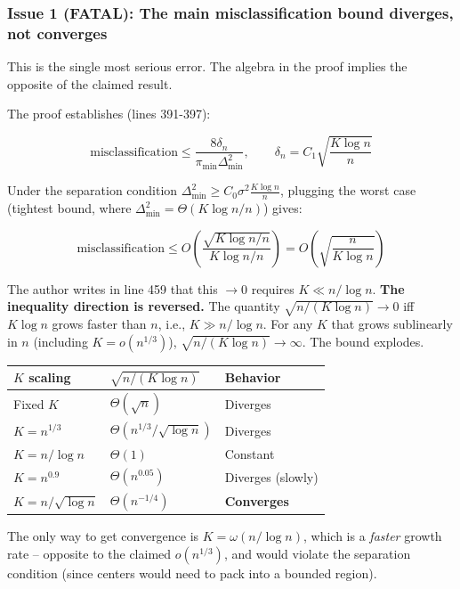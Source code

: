 \documentclass[
  12pt,
]{ctexart}
\begin{document}
\subsubsection{Issue 1 (FATAL): The main misclassification bound
diverges, not
converges}\label{issue-1-fatal-the-main-misclassification-bound-diverges-not-converges}

This is the single most serious error. The algebra in the proof implies
the opposite of the claimed result.

The proof establishes (lines 391-397):

\[\text{misclassification} \leq \frac{8\delta_n}{\pi_{\min} \Delta_{\min}^2}, \qquad \delta_n = C_1 \sqrt{\frac{K \log n}{n}}\]

Under the separation condition
\(\Delta_{\min}^2 \geq C_0 \sigma^2 \frac{K \log n}{n}\), plugging the
worst case (tightest bound, where
\(\Delta_{\min}^2 = \Theta(K \log n / n)\)) gives:

\[\text{misclassification} \leq O\left(\frac{\sqrt{K \log n / n}}{K \log n / n}\right) = O\left(\sqrt{\frac{n}{K \log n}}\right)\]

The author writes in line 459 that this \(\to 0\) requires
\(K \ll n / \log n\). \textbf{The inequality direction is reversed.} The
quantity \(\sqrt{n / (K \log n)} \to 0\) iff \(K \log n\) grows faster
than \(n\), i.e., \(K \gg n / \log n\). For any \(K\) that grows
sublinearly in \(n\) (including \(K = o(n^{1/3})\)),
\(\sqrt{n / (K \log n)} \to \infty\). The bound explodes.

\begin{longtable}[]{@{}lll@{}}
\toprule\noalign{}
\(K\) scaling & \(\sqrt{n / (K \log n)}\) & Behavior \\
\midrule\noalign{}
\endhead
\bottomrule\noalign{}
\endlastfoot
Fixed \(K\) & \(\Theta(\sqrt{n})\) & Diverges \\
\(K = n^{1/3}\) & \(\Theta(n^{1/3} / \sqrt{\log n})\) & Diverges \\
\(K = n / \log n\) & \(\Theta(1)\) & Constant \\
\(K = n^{0.9}\) & \(\Theta(n^{0.05})\) & Diverges (slowly) \\
\(K = n / \sqrt{\log n}\) & \(\Theta(n^{-1/4})\) & \textbf{Converges} \\
\end{longtable}

The only way to get convergence is \(K = \omega(n / \log n)\), which is
a \emph{faster} growth rate -- opposite to the claimed \(o(n^{1/3})\),
and would violate the separation condition (since centers would need to
pack into a bounded region).
\end{document}
